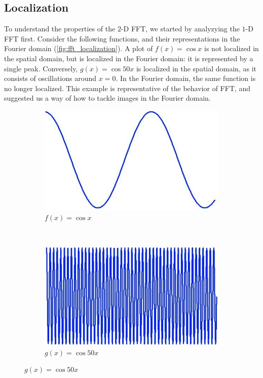 \documentclass{report}
\begin{document}
\subsection{Localization}
To understand the properties of the $2$-D FFT, we started by analyzying the $1$-D FFT first. Consider the following functions, and their representations in the Fourier domain (\ref{fig:fft_localization}). A plot of $f(x)=\cos {x}$ is not localized in the spatial domain, but is localized in the Fourier domain: it is represented by a single peak. Conversely, $g(x)=\cos {50x}$ is localized in the spatial domain, as it consists of oscillations around $x=0$. In the Fourier domain, the same function is no longer localized. This example is representative of the behavior of FFT, and suggested us a  way of how to tackle images in the Fourier domain.
\begin{figure}[h]
        \centering
        \begin{subfigure}[b]{0.2\textwidth}
                \includegraphics[width=\textwidth]{graphics/graph_fft_1.jpg}
                \caption{$f(x)=\cos{x}$}
                \label{fig:gull}
        \end{subfigure}%
        ~
        \begin{subfigure}[b]{0.2\textwidth}
                \includegraphics[width=\textwidth]{graphics/graph_fft_2.jpg}
                \caption{$g(x)=\cos{50x}$}
                \label{fig:tiger}
        \end{subfigure}
        

\end{figure}
\end{document}
